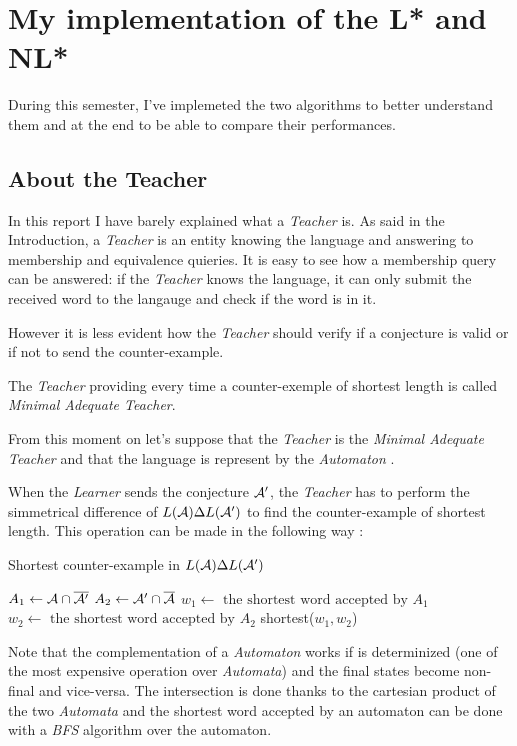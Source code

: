 \section{My implementation of the L* and NL*}
During this semester, I've implemeted the two algorithms to better understand them and at the end to be able to compare their performances.

\subsection{About the Teacher}
In this report I have barely explained what a \textit{Teacher} is. As said in the Introduction, a \textit{Teacher} is an entity knowing the language and answering to membership and equivalence quieries. It is easy to see how a membership query can be answered: if the \textit{Teacher} knows the language, it can only submit the received word to the langauge and check if the word is in it.

However it is less evident how the \textit{Teacher} should verify if a conjecture is valid or if not to send the counter-example.
\begin{definition}
  The \textit{Teacher} providing every time a counter-exemple of shortest length is called \textit{Minimal Adequate Teacher}.
\end{definition}

From this moment on let's suppose that the \textit{Teacher} is the \textit{Minimal Adequate Teacher} and that the language is represent by the \textit{Automaton} \automaton{}.

When the \textit{Learner} sends the conjecture $\mathcal{A}'$, the \textit{Teacher} has to perform the simmetrical difference of $L(\mathcal{A}) \Delta L(\mathcal{A'})$ to find the counter-example of shortest length. This operation can be made in the following way :

\begin{algorithm}
  \caption{Shortest counter-example in $L(\mathcal{A}) \Delta L(\mathcal{A'})$}
  $A_1 \gets \mathcal{A} \cap \overline{\mathcal{A'}}$\;
  $A_2 \gets \mathcal{A'} \cap \overline{\mathcal{A}}$\;
  $w_1 \gets \text{ the shortest word accepted by } A_1$\;
  $w_2 \gets \text{ the shortest word accepted by } A_2$\;
  \Return shortest($w_1, w_2$)\;
\end{algorithm}

Note that the complementation of a \textit{Automaton} \automaton{} works if \automaton{} is determinized (one of the most expensive operation over \textit{Automata}) and the final states become non-final and vice-versa. The intersection is done thanks to the cartesian product of the two \textit{Automata} and the shortest word accepted by an automaton can be done with a \textit{BFS} algorithm over the automaton.

